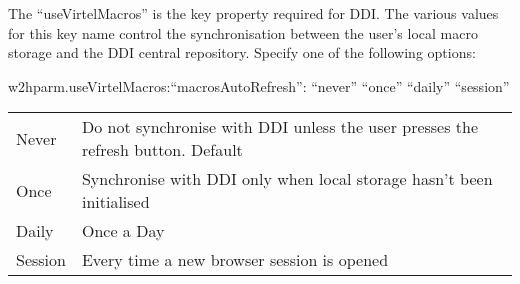 \documentclass[letterpaper,10pt,english]{sphinxmanual}
\begin{document}
The “useVirtelMacros” is the key property required for DDI. The various values for this key name control the synchronisation between the user’s local macro storage and the DDI central repository. Specify one of the following options:

\begin{sphinxVerbatim}[commandchars=\\\{\}]
\PYGZdq{}w2hparm.useVirtelMacros\PYGZdq{}:\PYGZob{}“macrosAutoRefresh”: “never” \textbar{} “once” \textbar{} “daily” \textbar{} “session” \PYGZcb{}
\end{sphinxVerbatim}

\ignorespaces 
{}


\begin{savenotes}\sphinxattablestart
\centering
\begin{tabulary}{\linewidth}[t]{|T|T|}
\hline
\sphinxstyletheadfamily 
{}
&\sphinxstyletheadfamily 
{}
\\
\hline
Never
&
Do not synchronise with DDI unless the user presses the refresh button. Default
\\
\hline
Once
&
Synchronise with DDI only when local storage hasn’t been initialised
\\
\hline
Daily
&
Once a Day
\\
\hline
Session
&
Every time a new browser session is opened
\\
\hline
\end{tabulary}
\par
\sphinxattableend\end{savenotes}
\end{document}
